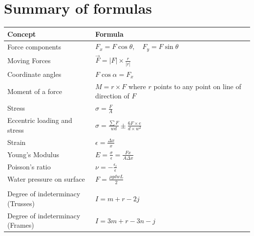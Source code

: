 
\section{Summary of formulas}
\small
\begin{tabular}{|l|l|}
    \hline
    \textbf{Concept}                  & \textbf{Formula}                                                                        \\\hline
    Force components                  & $F_x=F\cos\theta,\quad F_y=F\sin\theta$                                                 \\
    Moving Forces                     & $\vec{F}=|F|\times\frac{r}{|r|}$                                                        \\
    Coordinate angles                 & $F\cos\alpha = F_x$                                                                     \\
    Moment of a force                 & $M=r\times F$ where $r$ points to any point on line of direction of $F$                                                                           \\
    Stress                            & $\sigma=\frac{F}{A}$                                                                    \\
    Eccentric loading and stress      & $\sigma=\frac{\sum F}{wd}\pm \frac{6F\times e}{d\times w^2}$                            \\
    Strain                            & $\epsilon=\frac{\Delta x}{x}$                                                           \\
    Young's Modulus                   & $E=\frac{\sigma}{\epsilon}=\frac{Fx}{A\Delta x}$                                        \\
    Poisson's ratio                   & $\nu=-\frac{\epsilon_l}{\epsilon}$                                                      \\
    Water pressure on surface         & $F = \frac{\rho gdwL}{2}$                                                               \\
    &\\
    Degree of indeterminacy (Trusses) & $I=m+r-2j$                                                                              \\
    Degree of indeterminacy (Frames)  & $I=3m+r-3n-j$                                                                           \\

\end{tabular}
